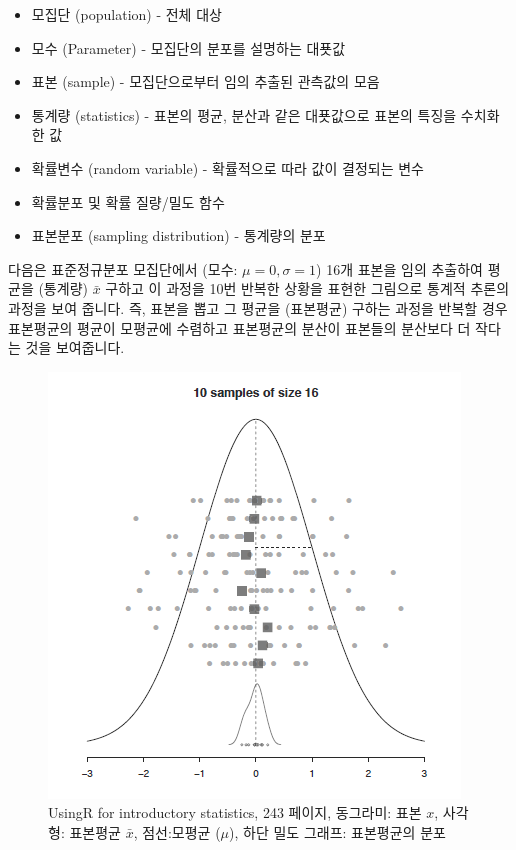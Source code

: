 \documentclass[
]{book}
\providecommand{\tightlist}{%
  \setlength{\itemsep}{0pt}\setlength{\parskip}{0pt}}
\begin{document}
\begin{itemize}
\tightlist
\item
  모집단 (population) - 전체 대상
\item
  모수 (Parameter) - 모집단의 분포를 설명하는 대푯값
\item
  표본 (sample) - 모집단으로부터 임의 추출된 관측값의 모음
\item
  통계량 (statistics) - 표본의 평균, 분산과 같은 대푯값으로 표본의 특징을 수치화한 값
\item
  확률변수 (random variable) - 확률적으로 따라 값이 결정되는 변수
\item
  확률분포 및 확률 질량/밀도 함수\\
\item
  표본분포 (sampling distribution) - 통계량의 분포
\end{itemize}

다음은 표준정규분포 모집단에서 (모수: \(\mu=0, \sigma=1\)) 16개 표본을 임의 추출하여 평균을 (통계량) \(\bar{x}\) 구하고 이 과정을 10번 반복한 상황을 표현한 그림으로 통계적 추론의 과정을 보여 줍니다. 즉, 표본을 뽑고 그 평균을 (표본평균) 구하는 과정을 반복할 경우 표본평균의 평균이 모평균에 수렴하고 표본평균의 분산이 표본들의 분산보다 더 작다는 것을 보여줍니다.

\begin{figure}
\centering
\includegraphics{images/12/01.png}
\caption{UsingR for introductory statistics, 243 페이지, 동그라미: 표본 \(x\), 사각형: 표본평균 \(\bar{x}\), 점선:모평균 (\(\mu\)), 하단 밀도 그래프: 표본평균의 분포}
\end{figure}
\end{document}
